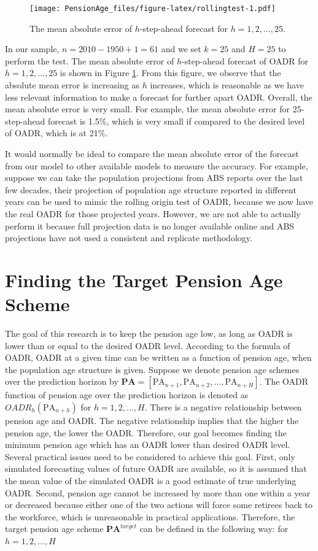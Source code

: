 \documentclass[11pt,a4paper,]{article}
\begin{document}
\begin{figure}
\centering
\texttt{[image: PensionAge\_files/figure-latex/rollingtest-1.pdf]}
\caption{\label{fig:rollingtest}The mean absolute error of \(h\)-step-ahead
forecast for \(h=1,2,\dots,25\).}
\end{figure}

In our sample, \(n=2010-1950+1=61\) and we set \(k=25\) and \(H=25\) to
perform the test. The mean absolute error of \(h\)-step-ahead forecast
of OADR for \(h=1,2,\dots,25\) is shown in Figure \ref{fig:rollingtest}.
From this figure, we observe that the absolute mean error is increasing
as \(h\) increases, which is reasonable as we have less relevant
information to make a forecast for further apart OADR. Overall, the mean
absolute error is very small. For example, the mean absolute error for
25-step-ahead forecast is 1.5\%, which is very small if compared to the
desired level of OADR, which is at 21\%.

It would normally be ideal to compare the mean absolute error of the
forecast from our model to other available models to measure the
accuracy. For example, suppose we can take the population projections
from ABS reports over the last few decades, their projection of
population age structure reported in different years can be used to
mimic the rolling origin test of OADR, because we now have the real OADR
for those projected years. However, we are not able to actually perform
it because full projection data is no longer available online and ABS
projections have not used a consistent and replicate methodology.

\section{Finding the Target Pension Age Scheme}\label{sec:target}

The goal of this research is to keep the pension age low, as long as
OADR is lower than or equal to the desired OADR level. According to the
formula of OADR, OADR at a given time can be written as a function of
pension age, when the population age structure is given. Suppose we
denote pension age schemes over the prediction horizon by
\(\bm{\text{PA}}=[\text{PA}_{n+1}, \text{PA}_{n+2},\dots,\text{PA}_{n+H}]\).
The OADR function of pension age over the prediction horizon is denoted
as \(OADR_h(\text{PA}_{n+h})\) for \(h=1,2,\dots,H\). There is a
negative relationship between pension age and OADR. The negative
relationship implies that the higher the pension age, the lower the
OADR. Therefore, our goal becomes finding the minimum pension age which
has an OADR lower than desired OADR level. Several practical issues need
to be considered to achieve this goal. First, only simulated forecasting
values of future OADR are available, so it is assumed that the mean
value of the simulated OADR is a good estimate of true underlying OADR.
Second, pension age cannot be increased by more than one within a year
or decreased because either one of the two actions will force some
retirees back to the workforce, which is unreasonable in practical
applications. Therefore, the target pension age scheme
\(\bm{\text{PA}}^{target}\) can be defined in the following way: for
\(h=1,2,\dots,H\)
\end{document}
